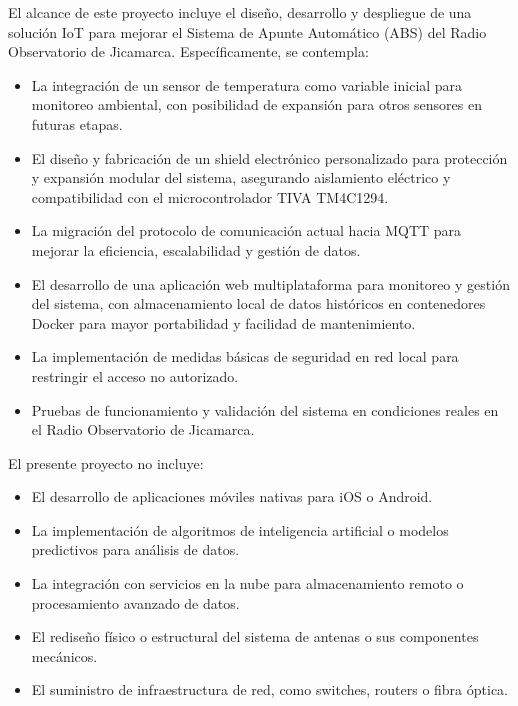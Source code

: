 \documentclass[
11pt, %
]{charter}
\begin{document}
El alcance de este proyecto incluye el diseño, desarrollo y despliegue de una solución IoT para mejorar el Sistema de Apunte Automático (ABS) del Radio Observatorio de Jicamarca. Específicamente, se contempla:

\begin{itemize}
	\item La integración de un sensor de temperatura como variable inicial para monitoreo ambiental, con posibilidad de expansión para otros sensores en futuras etapas.

	\item El diseño y fabricación de un shield electrónico personalizado para protección y expansión modular del sistema, asegurando aislamiento eléctrico y compatibilidad con el microcontrolador TIVA TM4C1294.

	\item La migración del protocolo de comunicación actual hacia MQTT para mejorar la eficiencia, escalabilidad y gestión de datos.

	\item El desarrollo de una aplicación web multiplataforma para monitoreo y gestión del sistema, con almacenamiento local de datos históricos en contenedores Docker para mayor portabilidad y facilidad de mantenimiento.

	\item La implementación de medidas básicas de seguridad en red local para restringir el acceso no autorizado.

	\item Pruebas de funcionamiento y validación del sistema en condiciones reales en el Radio Observatorio de Jicamarca.
\end{itemize}

El presente proyecto no incluye:

\begin{itemize}
	\item El desarrollo de aplicaciones móviles nativas para iOS o Android.

	\item La implementación de algoritmos de inteligencia artificial o modelos predictivos para análisis de datos.

	\item La integración con servicios en la nube para almacenamiento remoto o procesamiento avanzado de datos.

	\item El rediseño físico o estructural del sistema de antenas o sus componentes mecánicos.

	\item El suministro de infraestructura de red, como switches, routers o fibra óptica.
\end{itemize}
\end{document}
